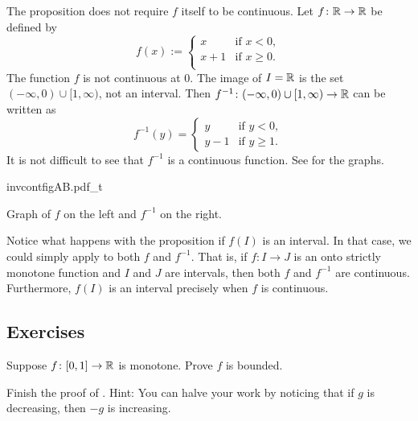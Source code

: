 \begin{example}
The proposition does not require $f$ itself to be continuous.  Let
$f \colon {\mathbb{R}} \to {\mathbb{R}}$ be defined by
\begin{equation*}
f(x) :=
\begin{cases}
x & \text{if } x < 0, \\
x+1 & \text{if } x \geq 0. \\
\end{cases}
\end{equation*}
The function $f$ is not continuous at $0$.
The image of $I = {\mathbb{R}}$ is the set 
$(-\infty,0)\cup [1,\infty)$, not an interval.
Then $f^{-1} \colon (-\infty,0)\cup [1,\infty)
\to {\mathbb{R}}$ can be written as
\begin{equation*}
f^{-1}(y) =
\begin{cases}
y & \text{if } y < 0, \\
y-1 & \text{if } y \geq 1. 
\end{cases}
\end{equation*}
It is not difficult to see that $f^{-1}$ is a continuous function.  See
 for the graphs.
\begin{myfigureht}
{invcontfigAB.pdf_t}
\caption{Graph of $f$ on the left and $f^{-1}$ on the right.\label{invcontfig}}
\end{myfigureht}
\end{example}

Notice what happens with the proposition if $f(I)$ is an interval.
In that case, we could simply
apply  to both $f$ and $f^{-1}$.  That is, if
$f \colon I \to J$ is an onto strictly monotone function and $I$ and $J$ are intervals,
then both $f$ and $f^{-1}$ are continuous.  Furthermore, $f(I)$ is an
interval precisely when $f$ is continuous.

\subsection{Exercises}

\begin{exercise}
Suppose $f \colon [0,1] \to {\mathbb{R}}$ is monotone.  Prove $f$ is bounded.
\end{exercise}

\begin{exercise}
Finish the proof of .
Hint: You can halve your work by noticing that if $g$ is decreasing,
then $-g$ is increasing.
\end{exercise}

